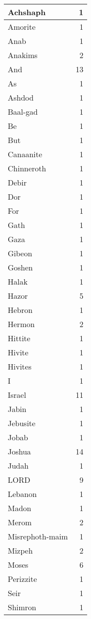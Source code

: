 \begin{center}
\begin{longtable}{l|r}
\hline \hline
\endlastfoot
Achshaph & 1 \\ \hline
Amorite & 1 \\ \hline
Anab & 1 \\ \hline
Anakims & 2 \\ \hline
And & 13 \\ \hline
As & 1 \\ \hline
Ashdod & 1 \\ \hline
Baal-gad & 1 \\ \hline
Be & 1 \\ \hline
But & 1 \\ \hline
Canaanite & 1 \\ \hline
Chinneroth & 1 \\ \hline
Debir & 1 \\ \hline
Dor & 1 \\ \hline
For & 1 \\ \hline
Gath & 1 \\ \hline
Gaza & 1 \\ \hline
Gibeon & 1 \\ \hline
Goshen & 1 \\ \hline
Halak & 1 \\ \hline
Hazor & 5 \\ \hline
Hebron & 1 \\ \hline
Hermon & 2 \\ \hline
Hittite & 1 \\ \hline
Hivite & 1 \\ \hline
Hivites & 1 \\ \hline
I & 1 \\ \hline
Israel & 11 \\ \hline
Jabin & 1 \\ \hline
Jebusite & 1 \\ \hline
Jobab & 1 \\ \hline
Joshua & 14 \\ \hline
Judah & 1 \\ \hline
LORD & 9 \\ \hline
Lebanon & 1 \\ \hline
Madon & 1 \\ \hline
Merom & 2 \\ \hline
Misrephoth-maim & 1 \\ \hline
Mizpeh & 2 \\ \hline
Moses & 6 \\ \hline
Perizzite & 1 \\ \hline
Seir & 1 \\ \hline
Shimron & 1 \\ \hline

\end{longtable}
\end{center}
